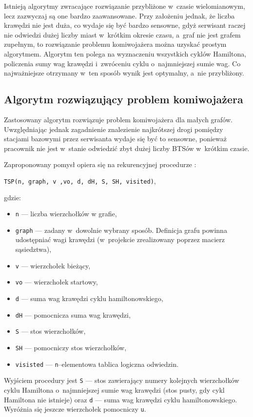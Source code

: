 \documentclass[12pt,a4paper]{report}
\begin{document}
Istnieją algorytmy zwracające rozwiązanie przybliżone w~czasie wielomianowym, lecz zazwyczaj są one bardzo zaawansowane. Przy założeniu jednak, że liczba krawędzi nie jest duża, co wydaje się być bardzo sensowne, gdyż serwisant raczej nie odwiedzi dużej liczby miast w~krótkim okresie czasu, a~graf nie jest grafem zupełnym, to rozwiązanie problemu komiwojażera można uzyskać prostym algorytmem. Algorytm ten polega na wyznaczeniu wszystkich cyklów Hamiltona, policzenia sumy wag krawędzi i~zwróceniu cyklu o~najmniejszej sumie wag. Co najważniejsze otrzymany w~ten sposób wynik jest optymalny, a~nie przybliżony. 

\subsection{Algorytm rozwiązujący problem komiwojażera}
Zastosowany algorytm rozwiązuje problem komiwojażera dla małych grafów. Uwzględniając jednak zagadnienie znalezienie najkrótszej drogi pomiędzy stacjami bazowymi przez serwisanta wydaje się być to sensowne, ponieważ pracownik nie jest w~stanie odwiedzić zbyt dużej liczby BTSów w~krótkim czasie. 

Zaproponowany pomysł opiera się na rekurencyjnej procedurze \cite{TSP_Tarnow}:

\begin{center}
\verb+TSP(n, graph, v ,vo, d, dH, S, SH, visited)+,
\end{center}
gdzie:

\begin{itemize}
  \item \verb+n+ --- liczba wierzchołków w grafie,
  \item \verb+graph+ --- zadany w~dowolnie wybrany sposób. Definicja grafu powinna udostępniać wagi krawędzi (w~projekcie zrealizowany poprzez macierz sąsiedztwa),
  \item \verb+v+ --- wierzchołek bieżący,
  \item \verb+vo+ --- wierzchołek startowy,
  \item \verb+d+ --- suma wag krawędzi cyklu hamiltonowskiego,
  \item \verb+dH+ --- pomocnicza suma wag krawędzi,
  \item \verb+S+ --- stos wierzchołków,
  \item \verb+SH+ --- pomocniczy stos wierzchołków,
  \item \verb+visisted+ --- \verb+n+--elementowa tablica logiczna odwiedzin.
\end{itemize}
Wyjściem procedury jest \verb+S+ --- stos zawierający numery kolejnych wierzchołków cyklu Hamiltona o~najmniejszej sumie wag krawędzi (stos pusty, gdy cykl Hamiltona nie istnieje) oraz \verb+d+ --- suma wag krawędzi cyklu hamiltonowskiego. Wyróżnia się jeszcze wierzchołek pomocniczy \verb+u+.
\end{document}
